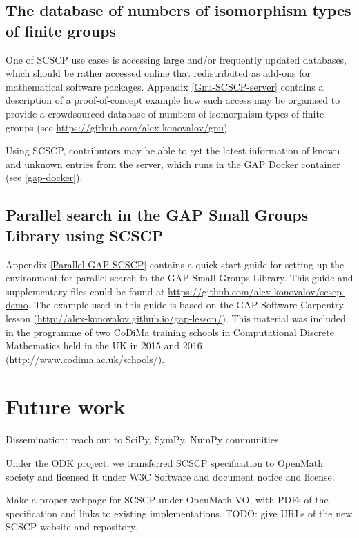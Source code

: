 \documentclass{deliverablereport}
\begin{document}
\subsection{The database of numbers of isomorphism
types of finite groups}\label{gnu-reproducibility}

One of SCSCP use cases is accessing large and/or frequently updated
databases, which should be rather accessed online that redistributed as
add-ons for mathematical software packages. Appendix \ref{Gnu-SCSCP-server}
contains a description of a proof-of-concept example how such access may
be organised to provide a crowdsourced database of numbers of isomorphism
types of finite groups (see  \url{https://github.com/alex-konovalov/gnu}). 

Using SCSCP, contributors may be able to get the latest information of 
known and unknown entries from the server, which runs in the GAP Docker 
container (see \ref{gap-docker}).


\subsection{Parallel search in the GAP Small Groups Library using SCSCP}

Appendix \ref{Parallel-GAP-SCSCP} contains a quick start guide for setting
up the environment for parallel search in the GAP Small Groups Library. This
guide and supplementary files could be found at \url{https://github.com/alex-konovalov/scscp-demo}. The example used in this guide is based on the GAP Software Carpentry
lesson (\url{http://alex-konovalov.github.io/gap-lesson/}). This material was
included in the programme of two CoDiMa training schools in Computational
Discrete Mathematics held in the UK in 2015 and 2016
(\url{http://www.codima.ac.uk/schools/}).


\section{Future work}

Dissemination: reach out to SciPy, SymPy, NumPy communities.

Under the ODK project, we transferred SCSCP specification
to OpenMath society and licensed it under
W3C Software and document notice and license.

Make a proper webpage for SCSCP under OpenMath VO, with
PDFs of the specification and links to existing implementations.
TODO: give URLs of the new SCSCP website and repository.
\end{document}
